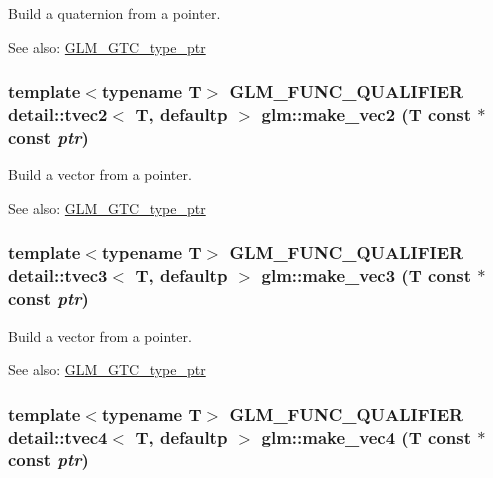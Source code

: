 Build a quaternion from a pointer. \begin{Desc}
\item[See also:]\hyperlink{group__gtc__type__ptr}{GLM\_\-GTC\_\-type\_\-ptr} \end{Desc}
\hypertarget{group__gtc__type__ptr_g7009d8090f046d1ce98e59df584fff46}{
\subsubsection[make\_\-vec2]{\setlength{\rightskip}{0pt plus 5cm}template$<$typename T$>$ GLM\_\-FUNC\_\-QUALIFIER detail::tvec2$<$ T, defaultp $>$ glm::make\_\-vec2 (T const $\ast$const  {\em ptr})}}
\label{group__gtc__type__ptr_g7009d8090f046d1ce98e59df584fff46}


Build a vector from a pointer. \begin{Desc}
\item[See also:]\hyperlink{group__gtc__type__ptr}{GLM\_\-GTC\_\-type\_\-ptr} \end{Desc}
\hypertarget{group__gtc__type__ptr_g0b727d0acba617ec7b9af9f06892336a}{
\subsubsection[make\_\-vec3]{\setlength{\rightskip}{0pt plus 5cm}template$<$typename T$>$ GLM\_\-FUNC\_\-QUALIFIER detail::tvec3$<$ T, defaultp $>$ glm::make\_\-vec3 (T const $\ast$const  {\em ptr})}}
\label{group__gtc__type__ptr_g0b727d0acba617ec7b9af9f06892336a}


Build a vector from a pointer. \begin{Desc}
\item[See also:]\hyperlink{group__gtc__type__ptr}{GLM\_\-GTC\_\-type\_\-ptr} \end{Desc}
\hypertarget{group__gtc__type__ptr_gf44d3c8aa09a7a8021ae5312e2f1f091}{
\subsubsection[make\_\-vec4]{\setlength{\rightskip}{0pt plus 5cm}template$<$typename T$>$ GLM\_\-FUNC\_\-QUALIFIER detail::tvec4$<$ T, defaultp $>$ glm::make\_\-vec4 (T const $\ast$const  {\em ptr})}}
\label{group__gtc__type__ptr_gf44d3c8aa09a7a8021ae5312e2f1f091}


